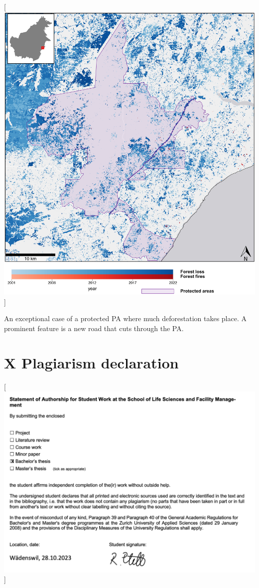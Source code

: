\documentclass[
  letterpaper,
  DIV=11,
  numbers=noendperiod]{scrreprt}
\begin{document}
{[}\includegraphics[width=1\textwidth,height=\textheight]{text/../code/results/maps/deforestation_protected_areas_other.png}{]}
\normalcolor

An exceptional case of a protected PA where much deforestation takes
place. A prominent feature is a new road that cuts through the PA.
\newpage

\hypertarget{sec-annex_x}{%
\section*{\texorpdfstring{\textsc{X} Plagiarism
declaration}{ Plagiarism declaration}}\label{sec-annex_x}}


\color{white}

{[}\includegraphics[width=1\textwidth,height=\textheight]{text/annex_files/plagiarism_declaration.png}{]}
\normalcolor \newpage
\end{document}
